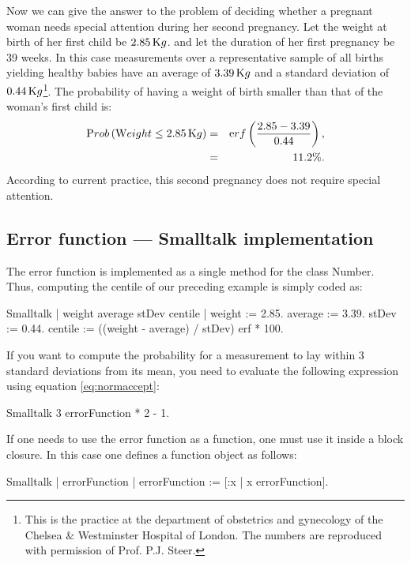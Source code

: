 \def\w{2.85}\def\av{3.39}\def\st{0.44}
 Now we can give the answer to the problem of deciding
whether a pregnant woman needs special attention during her second
pregnancy. Let the weight at birth of her first child be $\w\kg$.
and let the duration of her first pregnancy be 39 weeks. In this
case measurements over a representative sample of all births
yielding healthy babies have an average of $\av\kg$ and a standard
deviation of $\st\kg$\footnote{\label{ft:steer}This is the
practice at the department of obstetrics and gynecology of the
Chelsea $\&$ Westminster Hospital of London. The numbers are
reproduced with permission of Prof. P.J. Steer.}. The probability
of having a weight of birth smaller than that of the woman's first
child is:
\begin{eqnarray*}
\prob\left(\mathop{\textrm Weight}\le \w\kg \right) & = &
\erf\left({\w-\av\over\st}\right),\\ & = & 11.2\%.
\end{eqnarray*}
According to current practice, this second pregnancy does not
require special attention.

\subsection{Error function --- Smalltalk implementation}
\label{sec:sterrorfunction}  The error function is
implemented as a single method for the class Number. Thus,
computing the centile of our preceding example is simply coded as:
\begin{displaycode}{Smalltalk}
| weight average stDev centile |
weight := 2.85.
average := 3.39.
stDev := 0.44.
centile := ((weight - average) / stDev) erf * 100.
\end{displaycode}
If you want to compute the probability for a measurement to lay
within 3 standard deviations from its mean, you need to evaluate
the following expression using equation \ref{eq:normaccept}:
\begin{displaycode}{Smalltalk}
3 errorFunction * 2 - 1.
\end{displaycode}
If one needs to use the error function as a function, one must use
it inside a block closure. In this case one defines a function
object as follows:
\begin{displaycode}{Smalltalk}
| errorFunction |
errorFunction := [:x | x errorFunction].
\end{displaycode}

